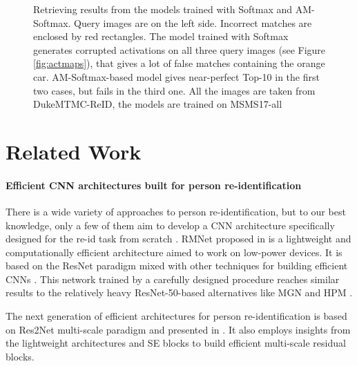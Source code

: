 \documentclass[a4paper,conference]{IEEEtran}
\begin{document}
\begin{figure*}
  \centering

  \caption{Retrieving results from the models trained with Softmax and AM-Softmax.
    Query images are on the left side. Incorrect matches are enclosed by red rectangles.
    The model trained with Softmax generates corrupted activations on all three
    query images (see Figure \ref{fig:actmaps}), that gives a lot of false
    matches containing the orange car. AM-Softmax-based model gives near-perfect
    Top-10 in the first two cases, but fails in the third one.  All the images
    are taken from DukeMTMC-ReID, the models are trained on MSMS17-all}
  \label{fig:top10}
\end{figure*}

\section{Related Work}

\paragraph{Efficient CNN architectures built for person re-identification}

There is a wide variety of approaches to person re-identification, but to our
best knowledge, only a few of them aim to develop a CNN architecture specifically designed for
the re-id task from scratch \cite{izutov2018fast, zhou2019osnet}.  RMNet
proposed in \cite{izutov2018fast} is a lightweight and computationally efficient
architecture aimed to work on low-power devices. It is based on the ResNet
\cite{resnet} paradigm mixed with other techniques for building efficient CNNs
\cite{mobilenet, squeezenet}.  This network trained by a carefully designed
procedure reaches similar results to the relatively heavy ResNet-50-based
alternatives like MGN \cite{mgn} and HPM \cite{hpm}.

The next generation of efficient architectures for person re-identification is
based on Res2Net \cite{res2net} multi-scale paradigm and presented in
\cite{zhou2019osnet}. It also employs insights from the lightweight
architectures \cite{mobilenet, mobilenetv2} and SE blocks \cite{seblock} to
build efficient multi-scale residual blocks.
\end{document}
